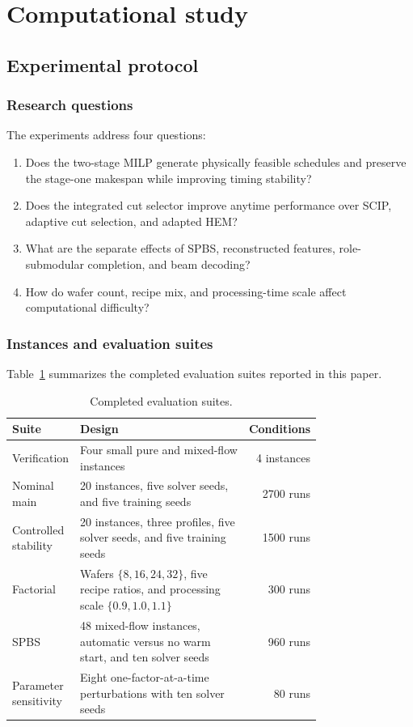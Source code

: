 \documentclass[preprint,12pt,authoryear]{elsarticle}
\begin{document}
\section{Computational study}
\label{sec:experiments}

\subsection{Experimental protocol}

\subsubsection{Research questions}

The experiments address four questions:
\begin{enumerate}[label=RQ\arabic*.,leftmargin=*]
  \item Does the two-stage MILP generate physically feasible schedules and
  preserve the stage-one makespan while improving timing stability?
  \item Does the integrated cut selector improve anytime performance over
  SCIP, adaptive cut selection, and adapted HEM?
  \item What are the separate effects of SPBS, reconstructed features,
  role-submodular completion, and beam decoding?
  \item How do wafer count, recipe mix, and processing-time scale affect
  computational difficulty?
\end{enumerate}

\subsubsection{Instances and evaluation suites}

Table~\ref{tab:suites} summarizes the completed evaluation suites reported in
this paper.

\begin{table}[htbp]
\centering
\caption{Completed evaluation suites.}
\label{tab:suites}
\begin{tabular}{p{0.20\linewidth}p{0.56\linewidth}r}
\toprule
Suite & Design & Conditions \\
\midrule
Verification & Four small pure and mixed-flow instances & 4 instances \\
Nominal main & 20 instances, five solver seeds, and five training seeds & 2700 runs \\
Controlled stability & 20 instances, three profiles, five solver seeds, and
five training seeds & 1500 runs \\
Factorial & Wafers $\{8,16,24,32\}$, five recipe ratios, and
processing scale $\{0.9,1.0,1.1\}$ & 300 runs \\
SPBS & 48 mixed-flow instances, automatic versus no warm start, and ten
solver seeds & 960 runs \\
Parameter sensitivity & Eight one-factor-at-a-time perturbations with ten
solver seeds & 80 runs \\
\bottomrule
\end{tabular}
\end{table}
\end{document}
